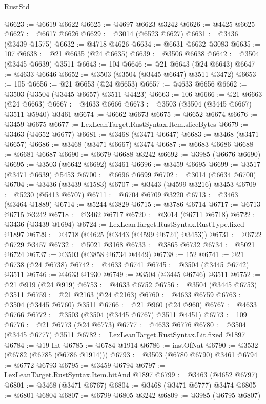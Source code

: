 \begin{lexlean}{RustStd}
\begin{coremodule}
@6623 := @6619 @6622
@6625 := @4697 @6623 @3242
@6626 := @4425 @6625
@6627 := @6617 @6626
@6629 := @3014 (@6523 @6627)
@6631 := @3436 (@3439 @1575)
@6632 := @4718 @4626
@6634 := @6631 @6632 @3083
@6635 := 107
@6638 := @21 @6635 (@24 @6635)
@6639 := @3506 @6638
@6642 := @3504 (@3445 @6639) @3511
@6643 := 104
@6646 := @21 @6643 (@24 @6643)
@6647 := @4633 @6646
@6652 := @3503 (@3504 (@3445 @6647) @3511 @3472)
@6653 := 105
@6656 := @21 @6653 (@24 @6653)
@6657 := @4633 @6656
@6662 := @3503 (@3504 (@3445 @6657) @3511 @4423)
@6663 := 106
@6666 := @21 @6663 (@24 @6663)
@6667 := @4633 @6666
@6673 := @3503 (@3504 (@3445 @6667) @3511 @5940) @3461
@6674 := @6662 @6673
@6675 := @6652 @6674
@6676 := @3459 @6675
@6677 := LexLeanTarget.RustSyntax.Item.sliceBytes
@6679 := @3463 (@4652 @6677)
@6681 := @3468 (@3471 @6647)
@6683 := @3468 (@3471 @6657)
@6686 := @3468 (@3471 @6667) @3474
@6687 := @6683 @6686
@6688 := @6681 @6687
@6690 := @6679 @6688 @3242
@6692 := @3985 (@6676 @6690)
@6695 := @3503 (@6642 @6692) @3461
@6696 := @3459 @6695
@6699 := @3517 (@3471 @6639) @5453
@6700 := @6696 @6699
@6702 := @3014 (@6634 @6700)
@6704 := @3436 (@3439 @1583)
@6707 := @3443 (@4599 @3216) @3453
@6709 := @5230 (@5413 @6707)
@6711 := @6704 @6709 @3220
@6713 := @3463 (@3464 @1889)
@6714 := @5244 @3829
@6715 := @3786 @6714
@6717 := @6713 @6715 @3242
@6718 := @3462 @6717
@6720 := @3014 (@6711 @6718)
@6722 := @3436 (@3439 @1694)
@6724 := LexLeanTarget.RustSyntax.RustType.fixed @1897
@6729 := @4718 (@4625 (@3443 (@4599 @6724) @3453))
@6731 := @6722 @6729 @3457
@6732 := @5021 @3168
@6733 := @3865 @6732
@6734 := @5021 @6724
@6737 := @3503 (@3858 @6734 @4449)
@6738 := 152
@6741 := @21 @6738 (@24 @6738)
@6742 := @4633 @6741
@6745 := @3504 (@3445 @6742) @3511
@6746 := @4633 @1930
@6749 := @3504 (@3445 @6746) @3511
@6752 := @21 @919 (@24 @919)
@6753 := @4633 @6752
@6756 := @3504 (@3445 @6753) @3511
@6759 := @21 @2163 (@24 @2163)
@6760 := @4633 @6759
@6763 := @3504 (@3445 @6760) @3511
@6766 := @21 @960 (@24 @960)
@6767 := @4633 @6766
@6772 := @3503 (@3504 (@3445 @6767) @3511 @4451)
@6773 := 109
@6776 := @21 @6773 (@24 @6773)
@6777 := @4633 @6776
@6780 := @3504 (@3445 @6777) @3511
@6782 := LexLeanTarget.RustSyntax.Lit.fixed @1897
@6784 := @19 Int
@6785 := @6784 @1914
@6786 := instOfNat
@6790 := @3532 (@6782 (@6785 (@6786 @1914)))
@6793 := @3503 (@6780 @6790) @3461
@6794 := @6772 @6793
@6795 := @3459 @6794
@6797 := LexLeanTarget.RustSyntax.Item.bitAnd @1897
@6799 := @3463 (@4652 @6797)
@6801 := @3468 (@3471 @6767)
@6804 := @3468 (@3471 @6777) @3474
@6805 := @6801 @6804
@6807 := @6799 @6805 @3242
@6809 := @3985 (@6795 @6807)

\end{coremodule}
\end{lexlean}
